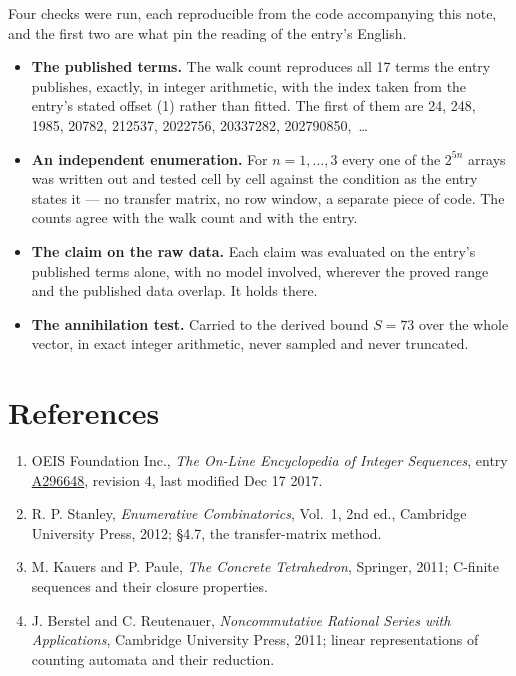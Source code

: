\documentclass[11pt]{article}
\theoremstyle{definition}
\begin{document}
Four checks were run, each reproducible from the code accompanying this note, and the first two are what pin the reading of the entry's English.

\begin{itemize}

\item {\bfseries The published terms.} The walk count reproduces all 17 terms the entry publishes, exactly, in integer arithmetic, with the index taken from the entry's stated offset (1) rather than fitted. The first of them are 24, 248, 1985, 20782, 212537, 2022756, 20337282, 202790850,~\dots

\item {\bfseries An independent enumeration.} For $n = 1,\dots,3$ every one of the $2^{5n}$ arrays was written out and tested cell by cell against the condition as the entry states it --- no transfer matrix, no row window, a separate piece of code. The counts agree with the walk count and with the entry.

\item {\bfseries The claim on the raw data.} Each claim was evaluated on the entry's published terms alone, with no model involved, wherever the proved range and the published data overlap. It holds there.

\item {\bfseries The annihilation test.} Carried to the derived bound $S = 73$ over the whole vector, in exact integer arithmetic, never sampled and never truncated.

\end{itemize}

\section{References}

\begin{enumerate}

\item OEIS Foundation Inc., \emph{The On-Line Encyclopedia of Integer Sequences}, entry \href{https://oeis.org/A296648}{A296648}, revision 4, last modified Dec 17 2017.

\item R. P. Stanley, \emph{Enumerative Combinatorics}, Vol.~1, 2nd ed., Cambridge University Press, 2012; \S4.7, the transfer-matrix method.

\item M. Kauers and P. Paule, \emph{The Concrete Tetrahedron}, Springer, 2011; C-finite sequences and their closure properties.

\item J. Berstel and C. Reutenauer, \emph{Noncommutative Rational Series with Applications}, Cambridge University Press, 2011; linear representations of counting automata and their reduction.

\end{enumerate}
\end{document}
